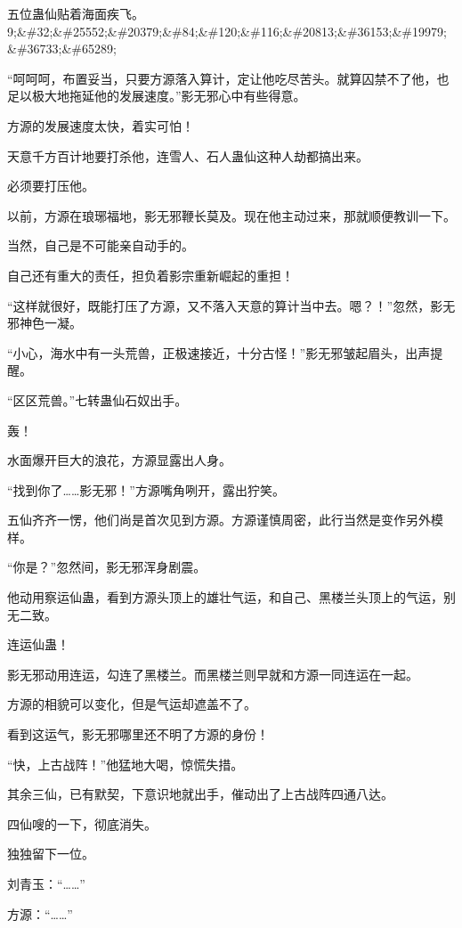 
\begin{this_body}

五位蛊仙贴着海面疾飞。9;\&\#32;\&\#25552;\&\#20379;\&\#84;\&\#120;\&\#116;\&\#20813;\&\#36153;\&\#19979;\&\#36733;\&\#65289;

“呵呵呵，布置妥当，只要方源落入算计，定让他吃尽苦头。就算囚禁不了他，也足以极大地拖延他的发展速度。”影无邪心中有些得意。

方源的发展速度太快，着实可怕！

天意千方百计地要打杀他，连雪人、石人蛊仙这种人劫都搞出来。

必须要打压他。

以前，方源在琅琊福地，影无邪鞭长莫及。现在他主动过来，那就顺便教训一下。

当然，自己是不可能亲自动手的。

自己还有重大的责任，担负着影宗重新崛起的重担！

“这样就很好，既能打压了方源，又不落入天意的算计当中去。嗯？！”忽然，影无邪神色一凝。

“小心，海水中有一头荒兽，正极速接近，十分古怪！”影无邪皱起眉头，出声提醒。

“区区荒兽。”七转蛊仙石奴出手。

轰！

水面爆开巨大的浪花，方源显露出人身。

“找到你了……影无邪！”方源嘴角咧开，露出狞笑。

五仙齐齐一愣，他们尚是首次见到方源。方源谨慎周密，此行当然是变作另外模样。

“你是？”忽然间，影无邪浑身剧震。

他动用察运仙蛊，看到方源头顶上的雄壮气运，和自己、黑楼兰头顶上的气运，别无二致。

连运仙蛊！

影无邪动用连运，勾连了黑楼兰。而黑楼兰则早就和方源一同连运在一起。

方源的相貌可以变化，但是气运却遮盖不了。

看到这运气，影无邪哪里还不明了方源的身份！

“快，上古战阵！”他猛地大喝，惊慌失措。

其余三仙，已有默契，下意识地就出手，催动出了上古战阵四通八达。

四仙嗖的一下，彻底消失。

独独留下一位。

刘青玉：“……”

方源：“……”


\end{this_body}
